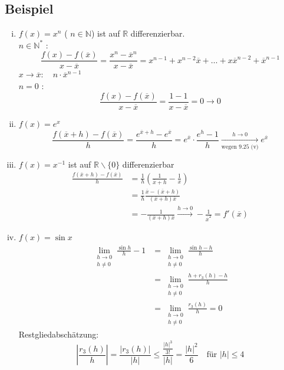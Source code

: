 \subsection{Beispiel} %
\label{sub:beispiel}
\begin{enumerate}[(i)]
	\item $f(x)= x^n$ ( $n \in \mathds{N} $) ist auf $\mathds{R}$ differenzierbar. \\
	$n \in \mathds{N}^*$ : 
	\[
		\frac{f(x) - f(\overline{x})}{x -\overline{x}} = \frac{x^n - \overline{x}^n}{x- \overline{x}} = x^{n-1} + x^{n-2} \overline{x} + \ldots + x \overline{x}^{n-2}
		+ \overline{x}^{n-1}  
	\]
	$x \to \overline{x} : \quad n \cdot \overline{x}^{n-1}$ 
	\vspace{10pt} \\
	$n=0$ : 
	\[
		\frac{f(x)- f(\overline{x})}{x- \overline{x}} = \frac{1-1}{x- \overline{x}} = 0 \to 0  
	\]
	\item $f(x)=e^x$
	\[
		\frac{f(\overline{x} +h) - f(\overline{x})}{h} = \frac{e^{\overline{x}+h} - e^{\overline{x}}}{h} 
		= e^{\overline{x}} \cdot \frac{e^h -1}{h} \underset{\text{wegen 9.25 (v)}}{\xrightarrow{h \to 0}} e^{\overline{x}}   
	\]
	\item $f(x)=x ^{-1}$ ist auf $\mathds{R} \backslash \{0\}$ differenzierbar
	\begin{align*}
		\frac{f( \overline{x} +h)- f(\overline{x})}{h} &= \frac{1}{h} (\frac{1}{\overline{x}+h} - \frac{1}{x}  ) \\
		&= \frac{1}{h} \frac{\overline{x} - (\overline{x} +h)}{(\overline{x} +h) \overline{x}} \\
		&= - \frac{1}{(\overline{x} +h) \overline{x}} \xrightarrow{h \to 0} - \frac{1}{\overline{x}^2} = f' (\overline{x})     
	\end{align*}
	\item $f(x)= \sin{x}$
	\begin{align*}
				\lim\limits_{\substack{h \to 0 \\ h \not= 0}} \frac{\sin h}{h}-1 &=   \lim\limits_{\substack{h \to 0 \\ h \not= 0}} \frac{\sin h -h}{h} \\
				&= \lim\limits_{\substack{h \to 0 \\ h \not= 0}} \frac{h + r_3(h) -h}{h} \\
				&= \lim\limits_{\substack{h \to 0 \\ h \not= 0}} \frac{r_3(h)}{h}  =0
	\end{align*}
	Restgliedabschätzung:
	\[
		\left| \frac{r_3(h)}{h} \right| = \frac{|r_3(h)|}{|h|} \le \frac{\frac{|h|^3}{3!} }{|h|} = \frac{|h|^2}{6}   \quad \text{für } |h|\le 4 
\]
\end{enumerate}

